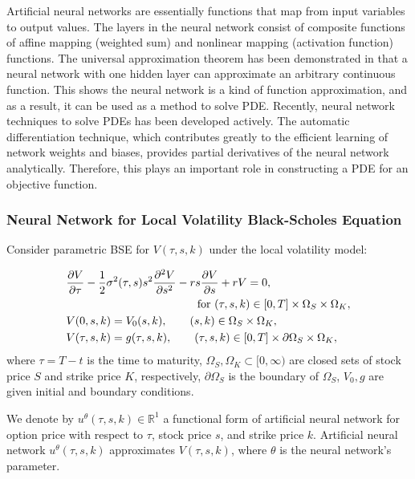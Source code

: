 \documentclass[11pt,reqno]{article}
\numberwithin{equation}{section}
\begin{document}
{Artificial neural networks are essentially functions that map from input variables to output values.
 The layers in the neural network consist of composite functions of affine mapping (weighted sum)
  and nonlinear mapping (activation function) functions.
The universal approximation theorem has been demonstrated in \cite{cybenko1989approximation}
 that a neural network with one hidden layer can approximate an arbitrary continuous function.
  This shows the neural network is a kind of function approximation, and as a result,
   it can be used as a method to solve PDE. Recently, neural network techniques to solve PDEs has been developed actively.
    The automatic differentiation technique, which contributes greatly to the efficient learning of network weights and biases, provides partial derivatives of the neural network analytically. Therefore, this plays an important role in constructing a PDE for an objective function.

\subsubsection{Neural Network for Local Volatility Black-Scholes Equation}
Consider parametric BSE for $ V(\tau,s,k)$ under the local volatility model:

\begin{equation*}%
\begin{aligned}
    &\frac{\partial V}{\partial \tau}
    - \frac{1}{2}\sigma^2(\tau,s)s^2\frac{\partial^2 V}{\partial s^2}
    - rs\frac{\partial V}{\partial s}
    + rV = 0, \\
&\hspace{40mm}   \text{ for }
    (\tau,s,k) \in [0,T] \times \Omega_S \times \Omega_K, \\
    &V(0,s,k) = V_0(s,k), \qquad (s,k) \in \Omega_S \times \Omega_K, \\
    &V(\tau,s,k) = g(\tau,s,k), \qquad (\tau,s,k) \in [0,T] \times \partial\Omega_S \times \Omega_K, 
\end{aligned}
\end{equation*}
where $\tau=T-t$ is the time to maturity,
$\Omega_S,\Omega_K \subset [0,\infty)$
are closed sets of stock price $S$ and strike price $K$, respectively,
 $\partial \Omega_S$ is the boundary of $\Omega_S$,
  $V_0, g$ are given initial and boundary conditions.
  
 We denote by $u^\theta (\tau,s,k) \in \mathbb{R}^1$ a functional form of artificial neural network
  for option price with respect to $\tau$, stock price $s$, and strike price $k$.
Artificial neural network $u^\theta (\tau,s,k)$ approximates $V(\tau,s,k)$,
 where $\theta$ is the neural network’s parameter.

}
\end{document}
